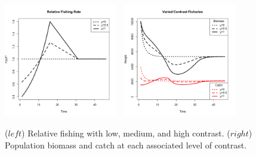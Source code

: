 \documentclass[ xcolor = pdftex, dvipsnames, table ]{beamer}
\begin{document}
\begin{frame}
\begin{minipage}[h!]{0.39\textwidth}
\end{minipage}


\end{frame}


%
\begin{frame}
%
\begin{figure}[h!]
\centering
\includegraphics[width=0.44\textwidth]{../../ptNew/relFish.png}
$~$
\includegraphics[width=0.44\textwidth]{../../ptNew/relSeries.png}
\caption{ \label{catchT45}
($left$) Relative fishing with low, medium, and high contrast.
($right$) Population biomass and catch at each associated level of contrast. %
}
\label{catch45}
\end{figure}
\end{frame}
\end{document}
